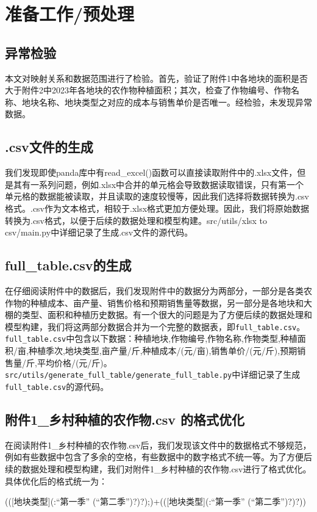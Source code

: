 \documentclass[withoutpreface]{cumcmthesis}
\begin{document}
\section{准备工作/预处理}
\subsection{异常检验}
本文对映射关系和数据范围进行了检验。首先，验证了附件1中各地块的面积是否大于附件2中2023年各地块的农作物种植面积；其次，检查了作物编号、作物名称、地块名称、地块类型之对应的成本与销售单价是否唯一。经检验，未发现异常数据。
\subsection{.csv文件的生成}
我们发现即使panda库中有read\_excel()函数可以直接读取附件中的.xlsx文件，但是其有一系列问题，例如.xlsx中合并的单元格会导致数据读取错误，只有第一个单元格的数据能被读取，并且读取的速度较慢等，因此我们选择将数据转换为.csv格式。.csv作为文本格式，相较于.xlsx格式更加方便处理。因此，我们将原始数据转换为.csv格式，以便于后续的数据处理和模型构建。src/utils/xlsx to csv/main.py中详细记录了生成.csv文件的源代码。

\subsection{full\_table.csv的生成}
在仔细阅读附件中的数据后，我们发现附件中的数据分为两部分，一部分是各类农作物的种植成本、亩产量、销售价格和预期销售量等数据，另一部分是各地块和大棚的类型、面积和种植历史数据。有一个很大的问题是为了方便后续的数据处理和模型构建，我们将这两部分数据合并为一个完整的数据表，即\verb|full_table.csv|。\verb|full_table.csv|中包含以下数据：种植地块,作物编号,作物名称,作物类型,种植面积/亩,种植季次,地块类型,亩产量/斤,种植成本/(元/亩),销售单价/(元/斤),预期销售量/斤,平均价格/(元/斤)。\verb|src/utils/generate_full_table/generate_full_table.py|中详细记录了生成\verb|full_table.csv|的源代码。

\subsection{附件1\_乡村种植的农作物.csv 的格式优化}
在阅读附件1\_乡村种植的农作物.csv后，我们发现该文件中的数据格式不够规范，例如有些数据中包含了多余的空格，有些数据中的数字格式不统一等。为了方便后续的数据处理和模型构建，我们对附件1\_乡村种植的农作物.csv进行了格式优化。具体优化后的格式统一为：
\begin{tcode}
    (([地块类型](:“第一季” (“第二季”)?)?);)+(([地块类型](:“第一季” (“第二季”)?)?))
\end{tcode}
\end{document}
